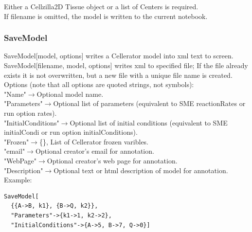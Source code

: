 \documentclass[12pt,letterpaper]{article}
\begin{document}
Either a Cellzilla2D Tissue object or a list of Centers is required.\\



If {\ttfamily filename} is omitted, the model is written to the current notebook.


\subsubsection*{SaveModel}

{\ttfamily SaveModel[model, options]} writes a Cellerator model into xml text to screen.\\

{\ttfamily SaveModel[filename, model, options]} writes xml to specified file; If the file already exists it is not overwritten, but a new file with a unique file name is created.\\

Options (note that all options are quoted strings, not symbols):\\

{\ttfamily "Name"}$\to$Optional model name.\\
{\ttfamily	"Parameters"}$\to$Optional list of parameters  (equivalent to SME reactionRates or run option rates).\\
{\ttfamily	"InitialConditions"}$\to$Optional list of initial conditions (equivalent to SME initialCondi or run option initialConditions).\\
{\ttfamily	"Frozen"}$\to$\{\}, List of Cellerator frozen varibles.\\
{\ttfamily	"email"}$\to$Optional creator's email for annotation.\\
{\ttfamily	"WebPage"}$\to$Optional creator's web page for annotation.\\
{\ttfamily	"Description"}$\to$Optional text or html description of model for annotation.\\

Example:

\begin{verbatim}
SaveModel[
  {{A->B, k1}, {B->Q, k2}}, 
  "Parameters"->{k1->1, k2->2}, 
  "InitialConditions"->{A->5, B->7, Q->0}]
\end{verbatim}
\end{document}
